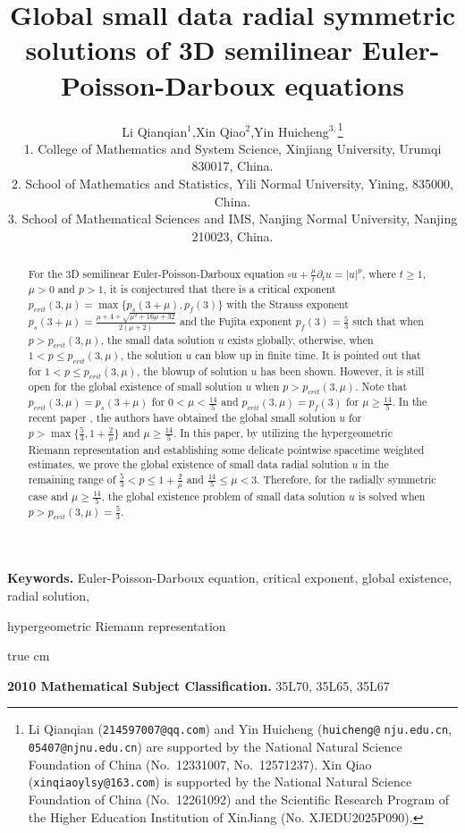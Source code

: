 \documentclass[11pt,twoside]{article}
\title{Global small data radial symmetric solutions of 3D semilinear Euler-Poisson-Darboux equations}
\author{Li Qianqian$^{1}$,\quad Xin Qiao$^{2}$,\quad Yin Huicheng$^{3,}$\footnote{Li Qianqian (\texttt{214597007@qq.com}) and Yin Huicheng
    (\texttt{huicheng@} \texttt{nju.edu.cn}, \texttt{05407@njnu.edu.cn}) are supported by the National Natural Science Foundation of China
    (No.~12331007, No.~12571237).  Xin Qiao (\texttt{xinqiaoylsy@163.com}) is supported by the National Natural Science Foundation of China
    (No.~12261092) and the Scientific
Research Program of the Higher Education Institution of XinJiang (No. XJEDU2025P090).}\vspace{0.5cm}\\
\small
1. College of Mathematics and System Science, Xinjiang University, Urumqi 830017, China.\\
\small
2. School of Mathematics and Statistics, Yili Normal University, Yining, 835000, China.\\
\small
3. School of Mathematical Sciences and IMS, Nanjing Normal University, Nanjing 210023, China.\\
}
\newcommand{\p}{\partial}
\newcommand{\f}{\frac}
\theoremstyle{plain}
\theoremstyle{definition}
\theoremstyle{remark}
\numberwithin{equation}{section}
\begin{document}
\date{}

\maketitle
\thispagestyle{empty}

\begin{abstract}
For the 3D semilinear Euler-Poisson-Darboux equation
$\square u+\f{\mu}{t}\p_tu=|u|^p$, where $t\geq1$, $\mu>0$ and $p>1$,
it is conjectured that there is a critical exponent  $p_{crit}(3,\mu)=\max\{p_s(3+\mu), p_f(3)\}$
with the Strauss exponent
$p_s(3+\mu)=\f{\mu+4+\sqrt{\mu^2+16\mu+32}}{2(\mu+2)}$
and the Fujita exponent $p_f(3)=\f{5}{3}$ such that when $p>p_{crit}(3,\mu)$, the small data solution $u$ exists globally,
otherwise, when $1<p\le p_{crit}(3,\mu)$, the solution $u$ can blow up in finite time.
It is pointed out that for $1<p\le p_{crit}(3,\mu)$, the blowup of solution $u$ has been shown.
However, it is still open for the global existence of small solution $u$ when $p>p_{crit}(3,\mu)$.
Note that $p_{crit}(3,\mu)=p_s(3+\mu)$ for $0<\mu<\f{14}{5}$ and $p_{crit}(3,\mu)=p_f(3)$ for
$\mu\geq\f{14}{5}$.
In the recent paper \cite{LY-2}, the authors have obtained the
global small solution $u$ for $p>\max\{\f{5}{3},1+\f{2}{\mu}\}$ and $\mu\geq\f{14}{5}$. In this paper, by
utilizing the hypergeometric Riemann representation and establishing some delicate pointwise spacetime weighted estimates, we prove
the global existence of small data radial solution $u$ in the remaining
range of $\f{5}{3}<p\leq1+\f{2}{\mu}$ and $\f{14}{5}\leq\mu<3$. Therefore, for
the radially symmetric case and $\mu\geq\f{14}{5}$, the global existence problem of small data solution
$u$ is solved when $p>p_{crit}(3,\mu)=\f{5}{3}$.
\end{abstract}

\noindent
\textbf{Keywords.} Euler-Poisson-Darboux equation, critical exponent, global existence, radial solution,

\qquad \quad hypergeometric Riemann representation

 true cm

\noindent
\textbf{2010 Mathematical Subject Classification.} 35L70, 35L65, 35L67

\tableofcontents

\end{document}
